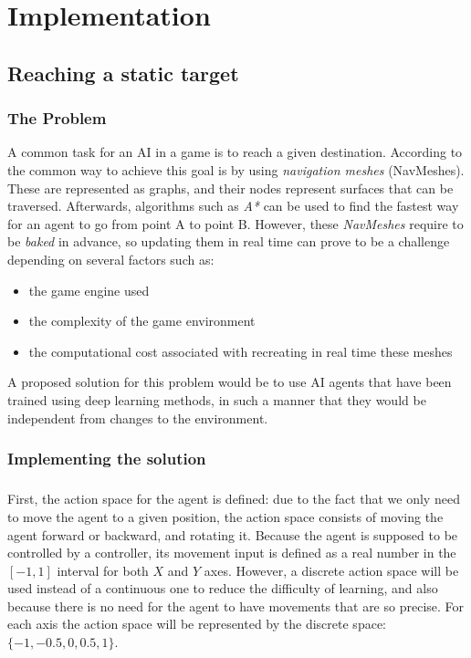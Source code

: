 \chapter{Implementation}
\section{Reaching a static target}
\subsection{The Problem} \label{static_target:the_problem}
A common task for an AI in a game is to reach a given destination. According to \cite{alonso2020deeplearningnavigation} the common way to achieve this goal is by using \emph{navigation meshes} (NavMeshes). These are represented as graphs, and their nodes represent surfaces that can be traversed. Afterwards, algorithms such as \emph{A*} can be used to find the fastest way for an agent to go from point A to point B. However, these \emph{NavMeshes} require to be \emph{baked} in advance, so updating them in real time can prove to be a challenge depending on several factors such as:
\begin{itemize}
    \item the game engine used
    \item the complexity of the game environment
    \item the computational cost associated with recreating in real time these meshes
\end{itemize}

A proposed solution for this problem would be to use AI agents that have been trained using deep learning methods, in such a manner that they would be independent from changes to the environment.

\subsection{Implementing the solution} \label{static_target:implementation}
\paragraph{}
First, the action space for the agent is defined: due to the fact that we only need to move the agent to a given position, the action space consists of moving the agent forward or backward, and rotating it. Because the agent is supposed to be controlled by a controller, its movement input is defined as a real number in the $[-1, 1]$ interval for both $X$ and $Y$ axes. However, a discrete action space will be used instead of a continuous one to reduce the difficulty of learning, and also because there is no need for the agent to have movements that are so precise. For each axis the action space will be represented by the discrete space: $\{-1, -0.5, 0, 0.5, 1\}$.

